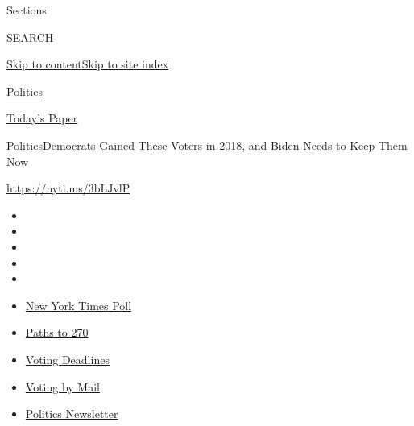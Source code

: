 Sections

SEARCH

\protect\hyperlink{site-content}{Skip to
content}\protect\hyperlink{site-index}{Skip to site index}

\href{https://www.nytimes3xbfgragh.onion/section/politics}{Politics}

\href{https://myaccount.nytimes3xbfgragh.onion/auth/login?response_type=cookie\&client_id=vi}{}

\href{https://www.nytimes3xbfgragh.onion/section/todayspaper}{Today's
Paper}

\href{/section/politics}{Politics}\textbar{}Democrats Gained These
Voters in 2018, and Biden Needs to Keep Them Now

\url{https://nyti.ms/3bLJvlP}

\begin{itemize}
\item
\item
\item
\item
\item
\end{itemize}

\begin{itemize}
\item
  \href{https://www.nytimes3xbfgragh.onion/2020/09/12/us/politics/biden-trump-poll-wisconsin-minnesota.html?action=click\&pgtype=Article\&state=default\&region=TOP_BANNER\&context=storylines_menu}{New
  York Times Poll}
\item
  \href{https://www.nytimes3xbfgragh.onion/interactive/2020/us/elections/election-states-biden-trump.html?action=click\&pgtype=Article\&state=default\&region=TOP_BANNER\&context=storylines_menu}{Paths
  to 270}
\item
  \href{https://www.nytimes3xbfgragh.onion/interactive/2019/us/elections/2020-presidential-election-calendar.html?action=click\&pgtype=Article\&state=default\&region=TOP_BANNER\&context=storylines_menu}{Voting
  Deadlines}
\item
  \href{https://www.nytimes3xbfgragh.onion/interactive/2020/08/31/us/politics/vote-by-mail-deadlines.html?action=click\&pgtype=Article\&state=default\&region=TOP_BANNER\&context=storylines_menu}{Voting
  by Mail}
\item
  \href{https://www.nytimes3xbfgragh.onion/newsletters/politics?action=click\&pgtype=Article\&state=default\&region=TOP_BANNER\&context=storylines_menu}{Politics
  Newsletter}
\end{itemize}

